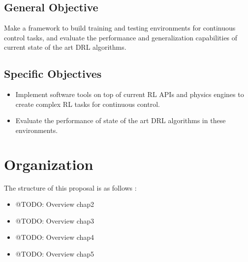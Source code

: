 \subsection*{General Objective}
Make a framework to build training and testing environments for continuous control tasks, and 
evaluate the performance and generalization capabilities of current state of the art DRL algorithms.

\subsection*{Specific Objectives}
\begin{itemize}
 \item Implement software tools on top of current RL APIs and physics engines 
       to create complex RL tasks for continuous control.
 \item Evaluate the performance of state of the art DRL algorithms in these environments.
\end{itemize}

\section{Organization}
\label{sec:organization}

The structure of this proposal is as follows :

\begin{itemize}
	\item @TODO: Overview chap2
	\item @TODO: Overview chap3
	\item @TODO: Overview chap4
	\item @TODO: Overview chap5
\end{itemize}
